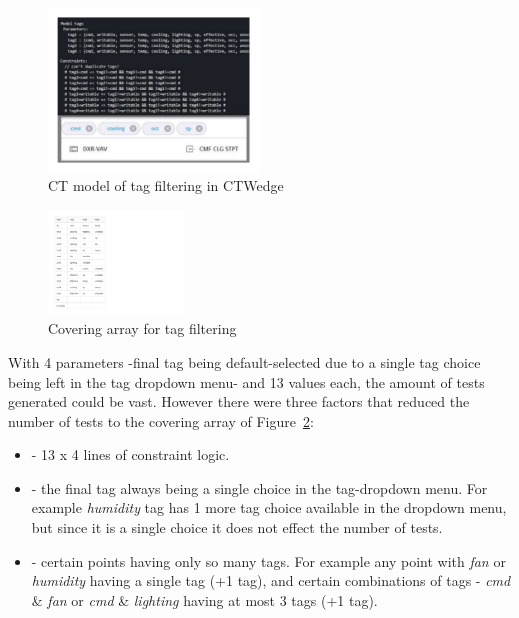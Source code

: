 \documentclass[conference]{IEEEtran}
\begin{document}
	\begin{figure}[!h]
		\includegraphics[width=0.50\textwidth,]{tagFilterModel.pdf}
		\caption{CT model of tag filtering in CTWedge}
		\label{fig:tagFilterModel}
	\end{figure}

	\begin{figure}[!hb]
		\centering
		\includegraphics[width=0.32\textwidth,]{tagFilterCoveringArray.pdf}
		\caption{Covering array for tag filtering}
		\label{fig:tagFilterCoveringArray}
	\end{figure}


	With 4 parameters -final tag being default-selected due to a single tag choice being left in the tag dropdown menu- and 13 values each, the amount of tests generated could be vast. 
	However there were three factors that reduced the number of tests to the covering array of Figure~\ref{fig:tagFilterCoveringArray}:
	
	\begin{itemize}
		\item [] - 13 x 4 lines of constraint logic.
		\item [] - the final tag always being a single choice in the tag-dropdown menu. For example \textit{humidity} tag has 1 more tag choice available in the dropdown menu, but since it is a single choice it does not effect the number of tests.
		\item [] - certain points having only so many tags. For example any point with \textit{fan} or \textit{humidity} having a single tag (+1 tag), and certain combinations of tags - \textit{cmd} \& \textit{fan} or \textit{cmd} \& \textit{lighting} having at most 3 tags (+1 tag).
	\end{itemize}
\end{document}
